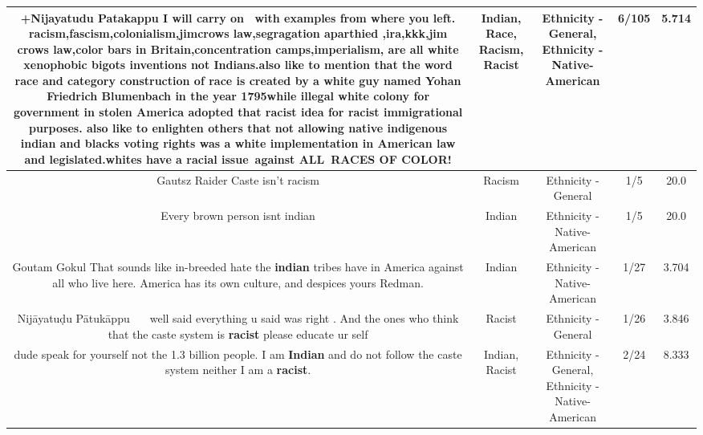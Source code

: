 \documentclass[11pt]{article}
\newlength\mylength
\begin{document}
\begin{center}
\begin{longtable}{|C{.65\mylength}|C{.30\mylength}|C{.12\mylength}|C{.12\mylength}|C{.12\mylength}|}
  \small +Nijayatudu Patakappu I will carry on  with examples from where you left. \textbf{racism},fascism,colonialism,jimcrows law,segragation aparthied ,ira,kkk,jim crows law,color bars in Britain,concentration camps,imperialism, are all white xenophobic bigots inventions not Indians.also like to mention that the word \textbf{race} and category construction of \textbf{race} is created by a white guy named Yohan Friedrich Blumenbach in the year 1795while illegal white colony for government in stolen America adopted that \textbf{racist} idea for \textbf{racist} immigrational purposes. also like to enlighten others that not allowing native indigenous \textbf{indian} and blacks voting rights was a white implementation in American law and legislated.whites have a racial issue against ALL RACES OF COLOR!\normalsize   & Indian, Race, Racism, Racist & Ethnicity - General, Ethnicity - Native-American & 6/105 & 5.714 \\  \hline
  \small Gautsz Raider Caste isn't racism\normalsize   & Racism & Ethnicity - General & 1/5 & 20.0 \\  \hline
  \small Every brown person isnt indian\normalsize   & Indian & Ethnicity - Native-American & 1/5 & 20.0 \\  \hline
  \small Goutam Gokul That sounds like in-breeded hate the \textbf{indian} tribes have in America against all who live here. America has its own culture, and despices yours Redman.\normalsize   & Indian & Ethnicity - Native-American & 1/27 & 3.704 \\  \hline
  \small Nijāyatuḍu Pātukāppu 👏🏾👏🏾 well said everything u said was right . And the ones who think that the caste system is \textbf{racist} please educate ur self\normalsize   & Racist & Ethnicity - General & 1/26 & 3.846 \\  \hline
  \small dude speak for yourself not the 1.3 billion people. I am \textbf{Indian} and do not follow the caste system neither I am a \textbf{racist}.\normalsize   & Indian, Racist & Ethnicity - General, Ethnicity - Native-American & 2/24 & 8.333 \\  \hline

\end{longtable}
\end{center}
\end{document}
